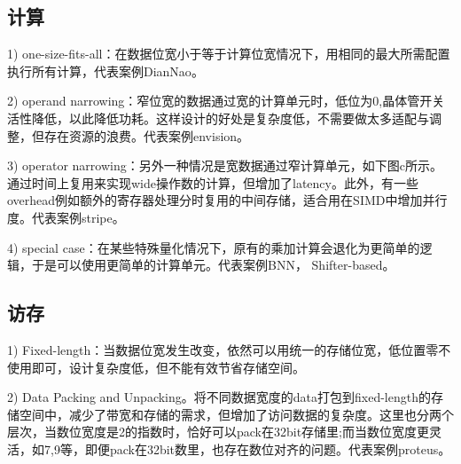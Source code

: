 \documentclass[UTF8]{scrartcl}
\begin{document}
	  \subsection{计算}
	  1) one-size-fits-all：在数据位宽小于等于计算位宽情况下，用相同的最大所需配置执行所有计算，代表案例DianNao\cite{diannao}。
	  
	  2) operand narrowing：窄位宽的数据通过宽的计算单元时，低位为0,晶体管开关活性降低，以此降低功耗。这样设计的好处是复杂度低，不需要做太多适配与调整，但存在资源的浪费。代表案例envision\cite{envision}。
	  
	  3) operator narrowing：另外一种情况是宽数据通过窄计算单元，如下图c所示。通过时间上复用来实现wide操作数的计算，但增加了latency。此外，有一些overhead例如额外的寄存器处理分时复用的中间存储，适合用在SIMD中增加并行度。代表案例stripe\cite{stripes}。
	  
	  4) special case：在某些特殊量化情况下，原有的乘加计算会退化为更简单的逻辑，于是可以使用更简单的计算单元。代表案例BNN\cite{finn}， Shifter-based\cite{shift}。
	  
	  \subsection{访存}
	  
	  1) Fixed-length：当数据位宽发生改变，依然可以用统一的存储位宽，低位置零不使用即可，设计复杂度低，但不能有效节省存储空间。
	  
	  2) Data Packing and Unpacking。将不同数据宽度的data打包到fixed-length的存储空间中，减少了带宽和存储的需求，但增加了访问数据的复杂度。这里也分两个层次，当数位宽度是2的指数时，恰好可以pack在32bit存储里;而当数位宽度更灵活，如7,9等，即便pack在32bit数里，也存在数位对齐的问题。代表案例proteus\cite{proteus}。
	  
	    
\end{document}
